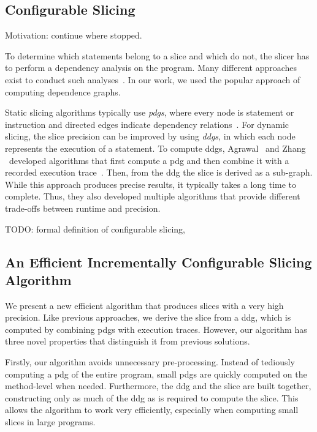\subsection{Configurable Slicing}

Motivation: continue where  stopped.

To determine which statements belong to a slice and which do not, the slicer has to perform a dependency analysis on the program.
Many different approaches exist to conduct such analyses~\cite{korel98:dynamic_program_slicing_methods, tip94:a_survey_of_program}. 
In our work, we used the popular approach of computing dependence graphs.

Static slicing algorithms typically use \emph{\acp{pdg}}, where every node is statement or instruction and directed edges indicate dependency relations~\cite{weiser81:program_slicing}.
For dynamic slicing, the slice precision can be improved by using \emph{\acp{ddg}}, in which each node represents the execution of a statement.
To compute \acp{ddg}, Agrawal \etal\ and Zhang \etal\ developed algorithms that first compute a \ac{pdg} and then combine it with a recorded execution trace~\cite{agrawal90:dynamic_program_slicing,zhang03:precise_dynamic_slicing_algorithms}.
Then, from the \ac{ddg} the slice is derived as a sub-graph.
While this approach produces precise results, it typically takes a long time to complete.
Thus, they also developed multiple algorithms that provide different trade-offs between runtime and precision.


TODO: formal definition of configurable slicing,

\subsection{An Efficient Incrementally Configurable Slicing Algorithm}

We present a new efficient algorithm that produces slices with a very high precision.
Like previous approaches, we derive the slice from a \ac{ddg}, which is computed by combining \acp{pdg} with execution traces.
However, our algorithm has three novel properties that distinguish it from previous solutions.

Firstly, our algorithm avoids unnecessary pre-processing.
Instead of tediously computing a \ac{pdg} of the entire program, small \acp{pdg} are quickly computed on the method-level when needed.
Furthermore, the \ac{ddg} and the slice are built together, constructing only as much of the \ac{ddg} as is required to compute the slice.
This allows the algorithm to work very efficiently, especially when computing small slices in large programs.

